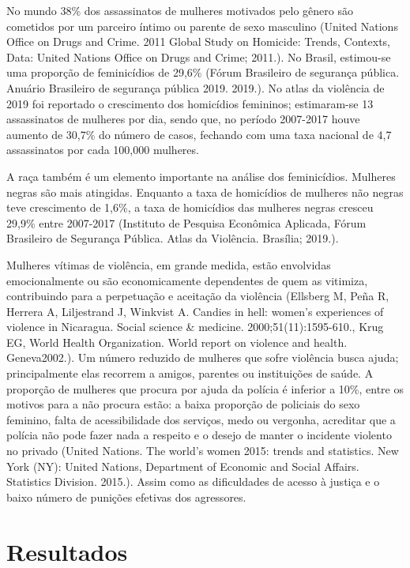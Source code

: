 No mundo 38\% dos assassinatos de mulheres motivados pelo gênero são cometidos por um parceiro íntimo ou parente de sexo masculino (United Nations Office on Drugs and Crime. 2011 Global Study on Homicide: Trends, Contexts, Data: United Nations Office on Drugs and Crime; 2011.). No Brasil, estimou-se uma proporção de feminicídios de 29,6\% (Fórum Brasileiro de segurança pública. Anuário Brasileiro de segurança pública 2019. 2019.). No atlas da violência de 2019 foi reportado o crescimento dos homicídios femininos; estimaram-se 13 assassinatos de mulheres por dia, sendo que, no período 2007-2017 houve aumento de 30,7\% do número de casos, fechando com uma taxa nacional de 4,7 assassinatos por cada 100,000 mulheres. 

A raça também é um elemento importante na análise dos feminicídios. Mulheres negras são mais atingidas. Enquanto a taxa de homicídios de mulheres não negras teve crescimento de 1,6\%, a taxa de homicídios das mulheres negras cresceu 29,9\% entre 2007-2017 (Instituto de Pesquisa Econômica Aplicada, Fórum Brasileiro de Segurança Pública. Atlas da Violência. Brasília; 2019.).

Mulheres vítimas de violência, em grande medida, estão envolvidas emocionalmente ou são economicamente dependentes de quem as vitimiza, contribuindo para a perpetuação e aceitação da violência (Ellsberg M, Peña R, Herrera A, Liljestrand J, Winkvist A. Candies in hell: women’s experiences of violence in Nicaragua. Social science & medicine. 2000;51(11):1595-610., Krug EG, World Health Organization. World report on violence and health. Geneva2002.). Um número reduzido de mulheres que sofre violência busca ajuda; principalmente elas recorrem a amigos, parentes ou instituições de saúde. A proporção de mulheres que procura por ajuda da polícia é inferior a 10\%, entre os motivos para a não procura estão: a baixa proporção de policiais do sexo feminino, falta de acessibilidade dos serviços, medo ou vergonha, acreditar que a polícia não pode fazer nada a respeito e o desejo de manter o incidente violento no privado (United  Nations. The world’s women 2015: trends and statistics. New York (NY): United Nations, Department of Economic and Social Affairs. Statistics Division. 2015.). Assim como as dificuldades de acesso à justiça e o baixo número de punições efetivas dos agressores.

\section{Resultados}

